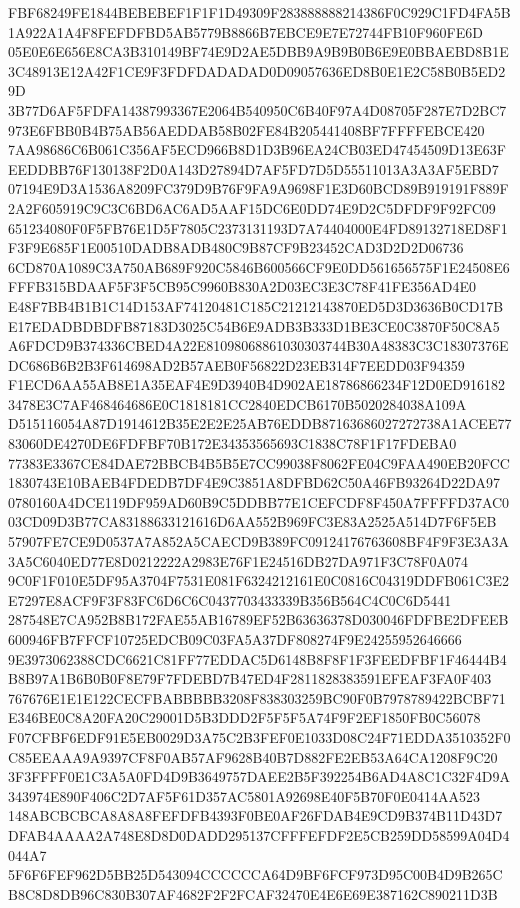 \documentclass[UTF8,fontset=fandol,zihao=-4,a4paper]{ctexart}
\begin{document}
{{FBF68249FE1844BEBEBEF1F1F1D49309F283888888214386F0C929C1FD4FA5B1A922A1A4F8FEFDFBD5AB5779B8866B7EBCE9E7E72744FB10F960FE6D
05E0E6E656E8CA3B310149BF74E9D2AE5DBB9A9B9B0B6E9E0BBAEBD8B1E3C48913E12A42F1CE9F3FDFDADADAD0D09057636ED8B0E1E2C58B0B5ED29D
3B77D6AF5FDFA14387993367E2064B540950C6B40F97A4D08705F287E7D2BC7973E6FBB0B4B75AB56AEDDAB58B02FE84B205441408BF7FFFFEBCE420
7AA98686C6B061C356AF5ECD966B8D1D3B96EA24CB03ED47454509D13E63FEEDDBB76F130138F2D0A143D27894D7AF5FD7D5D55511013A3A3AF5EBD7
07194E9D3A1536A8209FC379D9B76F9FA9A9698F1E3D60BCD89B919191F889F2A2F605919C9C3C6BD6AC6AD5AAF15DC6E0DD74E9D2C5DFDF9F92FC09
651234080F0F5FB76E1D5F7805C2373131193D7A74404000E4FD89132718ED8F1F3F9E685F1E00510DADB8ADB480C9B87CF9B23452CAD3D2D2D06736
6CD870A1089C3A750AB689F920C5846B600566CF9E0DD561656575F1E24508E6FFFB315BDAAF5F3F5CB95C9960B830A2D03EC3E3C78F41FE356AD4E0
E48F7BB4B1B1C14D153AF74120481C185C21212143870ED5D3D3636B0CD17BE17EDADBDBDFB87183D3025C54B6E9ADB3B333D1BE3CE0C3870F50C8A5
A6FDCD9B374336CBED4A22E81098068861030303744B30A48383C3C18307376EDC686B6B2B3F614698AD2B57AEB0F56822D23EB314F7EEDD03F94359
F1ECD6AA55AB8E1A35EAF4E9D3940B4D902AE18786866234F12D0ED9161823478E3C7AF468464686E0C1818181CC2840EDCB6170B5020284038A109A
D515116054A87D1914612B35E2E2E25AB76EDDB87163686027272738A1ACEE7783060DE4270DE6FDFBF70B172E34353565693C1838C78F1F17FDEBA0
77383E3367CE84DAE72BBCB4B5B5E7CC99038F8062FE04C9FAA490EB20FCC1830743E10BAEB4FDEDB7DF4E9C3851A8DFBD62C50A46FB93264D22DA97
0780160A4DCE119DF959AD60B9C5DDBB77E1CEFCDF8F450A7FFFFD37AC003CD09D3B77CA83188633121616D6AA552B969FC3E83A2525A514D7F6F5EB
57907FE7CE9D0537A7A852A5CAECD9B389FC09124176763608BF4F9F3E3A3A3A5C6040ED77E8D0212222A2983E76F1E24516DB27DA971F3C78F0A074
9C0F1F010E5DF95A3704F7531E081F6324212161E0C0816C04319DDFB061C3E2E7297E8ACF9F3F83FC6D6C6C0437703433339B356B564C4C0C6D5441
287548E7CA952B8B172FAE55AB16789EF52B63636378D030046FDFBE2DFEEB600946FB7FFCF10725EDCB09C03FA5A37DF808274F9E24255952646666
9E3973062388CDC6621C81FF77EDDAC5D6148B8F8F1F3FEEDFBF1F46444B4B8B97A1B6B0B0F8E79F7FDEBD7B47ED4F2811828383591EFEAF3FA0F403
767676E1E1E122CECFBABBBBB3208F838303259BC90F0B7978789422BCBF71E346BE0C8A20FA20C29001D5B3DDD2F5F5F5A74F9F2EF1850FB0C56078
F07CFBF6EDF91E5EB0029D3A75C2B3FEF0E1033D08C24F71EDDA3510352F0C85EEAAA9A9397CF8F0AB57AF9628B40B7D882FE2EB53A64CA1208F9C20
3F3FFFF0E1C3A5A0FD4D9B3649757DAEE2B5F392254B6AD4A8C1C32F4D9A343974E890F406C2D7AF5F61D357AC5801A92698E40F5B70F0E0414AA523
148ABCBCBCA8A8A8FEFDFB4393F0BE0AF26FDAB4E9CD9B374B11D43D7DFAB4AAAA2A748E8D8D0DADD295137CFFFEFDF2E5CB259DD58599A04D4044A7
5F6F6FEF962D5BB25D543094CCCCCCA64D9BF6FCF973D95C00B4D9B265CB8C8D8DB96C830B307AF4682F2F2FCAF32470E4E6E69E387162C890211D3B
}}
\end{document}
